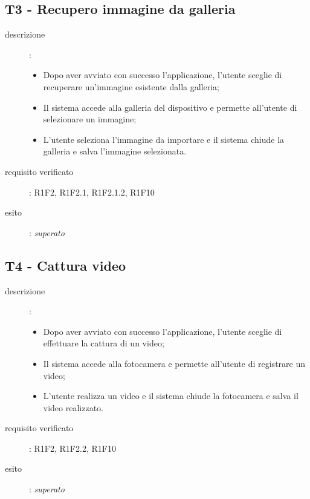 \subsection{T3 - Recupero immagine da galleria}
\begin{description}
\item[descrizione]: \hfill
	\begin{itemize}
	\item Dopo aver avviato con successo l'applicazione, l'utente sceglie di recuperare un'immagine esistente dalla galleria;
	\item Il sistema accede alla galleria del dispositivo e permette all'utente di selezionare un immagine;
	\item L'utente seleziona l'immagine da importare e il sistema chiude la galleria e salva l'immagine selezionata.
	\end{itemize}
\item[requisito verificato]: R1F2, R1F2.1, R1F2.1.2, R1F10
\item[esito]: \emph{superato}
\end{description}

\subsection{T4 - Cattura video}
\begin{description}
\item[descrizione]: \hfill
	\begin{itemize}
	\item Dopo aver avviato con successo l'applicazione, l'utente sceglie di effettuare la cattura di un video;
	\item Il sistema accede alla fotocamera e permette all'utente di registrare un video;
	\item L'utente realizza un video e il sistema chiude la fotocamera e salva il video realizzato.
	\end{itemize}
\item[requisito verificato]: R1F2, R1F2.2, R1F10
\item[esito]: \emph{superato}
\end{description}

